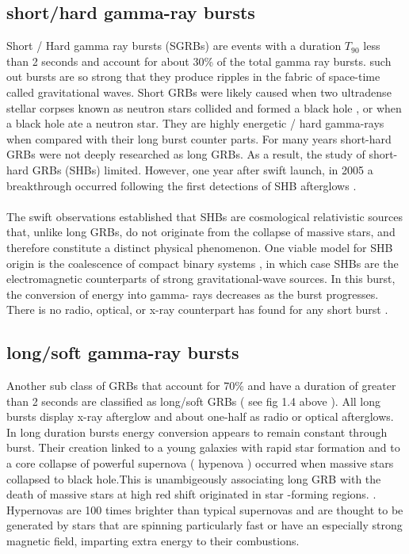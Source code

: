 \subsection{short/hard gamma-ray bursts} 
Short / Hard  gamma  ray  bursts  (SGRBs)  are  events  with  a duration $T_{90}$ less than 2 seconds  and  account for  about  30\%  of  the total  gamma  ray  bursts. such  out  bursts   are so strong  that  they  produce   ripples in the  fabric of space-time  called   gravitational  waves.  Short  GRBs  were  likely  caused  when  two  ultradense  stellar  corpses   known  as  neutron  stars  collided  and formed a black hole , or  when   a black  hole   ate  a neutron  star.  They  are  highly  energetic / hard   gamma-rays  when  compared  with their  long  burst  counter  parts. For  many years  short-hard  GRBs  were  not  deeply   researched as long  GRBs. As a result, the  study  of short-hard  GRBs (SHBs) limited.  However, one  year  after  swift  launch, in 2005 a breakthrough  occurred  following  the first  detections  of  SHB  afterglows \citep{5}\citep{6}.\\\\
The  swift  observations  established that SHBs are  cosmological relativistic sources  that, unlike long GRBs, do not originate from the collapse of massive stars, and  therefore  constitute  a distinct  physical  phenomenon. One viable  model for SHB  origin  is  the  coalescence  of  compact  binary systems , in which case SHBs are   the  electromagnetic  counterparts of strong  gravitational-wave sources. In this  burst, the  conversion  of  energy  into gamma- rays  decreases  as  the burst progresses. There  is  no  radio,  optical, or  x-ray  counterpart  has  found  for any  short  burst \citep{5}.
\subsection{long/soft gamma-ray bursts}
Another  sub  class  of  GRBs  that  account for 70\%  and  have  a duration  of greater  than 2 seconds  are  classified  as long/soft  GRBs ( see fig 1.4 above ).  All long  bursts  display  x-ray  afterglow  and  about  one-half  as  radio  or  optical  afterglows. In  long  duration  bursts  energy  conversion  appears  to  remain  constant  through  burst. Their  creation  linked  to  a young  galaxies  with  rapid  star  formation  and  to  a core  collapse  of  powerful supernova ( hypenova )  occurred  when  massive stars  collapsed to black hole.This is  unambigeously   associating  long  GRB  with  the  death  of  massive  stars at high red  shift  originated  in  star -forming  regions.  \citep{6}. Hypernovas  are  100  times  brighter  than  typical  supernovas  and  are  thought  to  be  generated  by  stars  that   are   spinning   particularly  fast  or  have  an  especially  strong  magnetic  field,  imparting   extra  energy  to  their  combustions. 
